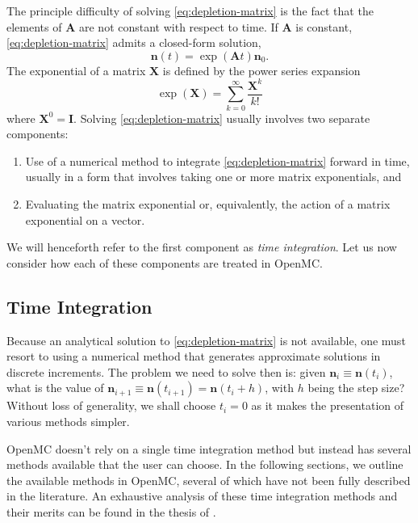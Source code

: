 \documentclass[3p,authoryear]{elsarticle}
\newcommand{\vect}[1]{\mathbf{#1}} %
\begin{document}
The principle difficulty of solving \cref{eq:depletion-matrix} is the fact that
the elements of $\vect{A}$ are not constant with respect to time. If
$\vect{A}$ is constant, \cref{eq:depletion-matrix} admits a closed-form
solution,
\begin{equation}
  \label{eq:constant-A}
  \vect{n}(t) = \exp \left (\vect{A} t \right ) \vect{n}_0.
\end{equation}
The exponential of a matrix $\vect{X}$ is defined by the power series
expansion
\begin{equation}
  \exp(\vect{X}) = \sum\limits_{k=0}^\infty \frac{\vect{X}^k}{k!}
\end{equation}
where $\vect{X}^0 = \vect{I}$. Solving \cref{eq:depletion-matrix} usually
involves two separate components:
\begin{enumerate}
  \item Use of a numerical method to integrate \cref{eq:depletion-matrix}
  forward in time, usually in a form that involves taking one or more matrix
  exponentials, and
  \item Evaluating the matrix exponential or, equivalently, the action of a
  matrix exponential on a vector.
\end{enumerate}
We will henceforth refer to the first component as \emph{time integration}. Let
us now consider how each of these components are treated in OpenMC.

\subsection{Time Integration}
\label{sec:time_integration}

Because an analytical solution to \cref{eq:depletion-matrix} is not available,
one must resort to using a numerical method that generates approximate solutions
in discrete increments. The problem we need to solve then is: given $\vect{n}_i
\equiv \vect{n}(t_i)$, what is the value of $\vect{n}_{i+1} \equiv
\vect{n}(t_{i+1}) = \vect{n}(t_i + h)$, with $h$ being the step size? Without
loss of generality, we shall choose $t_i=0$ as it makes the presentation of
various methods simpler.

OpenMC doesn't rely on a single time integration method but instead has several
methods available that the user can choose. In the following sections, we
outline the available methods in OpenMC, several of which have not been
fully described in the literature. An exhaustive analysis of these time
integration methods and their merits can be found in the thesis of
\citet{josey2017phd}.
\end{document}
